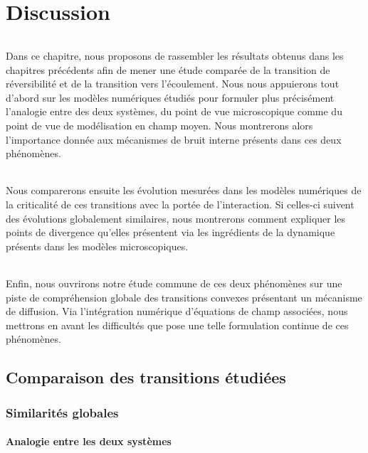 \chapter{Discussion}

\label{chapter:discussion}


\subparagraph{}Dans ce chapitre, nous proposons de rassembler les résultats obtenus dans les chapitres précédents afin de mener une étude comparée de la transition de réversibilité et de la transition vers l'écoulement. Nous nous appuierons tout d'abord sur les modèles numériques étudiés pour formuler plus précisément l'analogie entre des deux systèmes, du point de vue microscopique comme du point de vue de modélisation en champ moyen. Nous montrerons alors l'importance donnée aux mécanismes de bruit interne présents dans ces deux phénomènes.

\subparagraph{}Nous comparerons ensuite les évolution mesurées dans les modèles numériques de la criticalité de ces transitions avec la portée de l'interaction. Si celles-ci suivent des évolutions globalement similaires, nous montrerons comment expliquer les points de divergence qu'elles présentent via les ingrédients de la dynamique présents dans les modèles microscopiques.

\subparagraph{}Enfin, nous ouvrirons notre étude commune de ces deux phénomènes sur une piste de compréhension globale des transitions convexes présentant un mécanisme de diffusion. Via l'intégration numérique d'équations de champ associées, nous mettrons en avant les difficultés que pose une telle formulation continue de ces phénomènes.

\section{Comparaison des transitions étudiées}

\subsection{Similarités globales}

\subsubsection{Analogie entre les deux systèmes}

